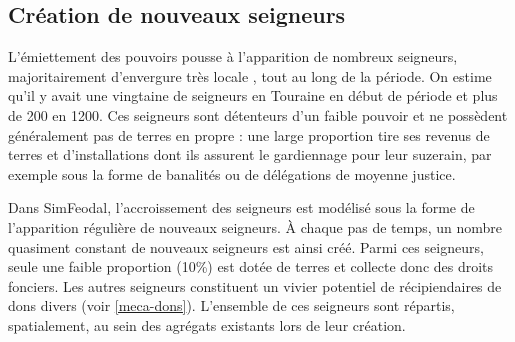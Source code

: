 %	
%



\subsection{Création de nouveaux seigneurs}

L'émiettement des pouvoirs pousse à l'apparition de nombreux seigneurs, majoritairement d'envergure très locale , tout au long de la période.
On estime qu'il y avait une vingtaine de seigneurs en Touraine en début de période et plus de 200 en 1200.
Ces seigneurs sont détenteurs d'un faible pouvoir et ne possèdent généralement pas de terres \og en propre\fg{} : une large proportion tire ses revenus de terres et d'installations dont ils assurent le gardiennage pour leur suzerain, par exemple sous la forme de banalités ou de délégations de moyenne justice.

\begin{tcolorbox}[breakable,left=0pt,right=0pt,top=0pt,bottom=0pt,
	colback=gray!15,colframe=gray!15,width=\dimexpr\textwidth\relax, 
	enlarge left by=0mm, boxsep=5pt,arc=0pt,outer arc=0pt]
Dans SimFeodal, l'accroissement des seigneurs est modélisé sous la forme de l'apparition régulière de nouveaux seigneurs.
À chaque pas de temps, un nombre quasiment constant\footnotemark{} de nouveaux seigneurs est ainsi créé.
Parmi ces seigneurs, seule une faible proportion (10\%) est dotée de terres et collecte donc des droits fonciers.
Les autres seigneurs constituent un vivier potentiel de récipiendaires de dons divers (voir \cref{meca-dons}).
L'ensemble de ces seigneurs sont répartis, spatialement, au sein des agrégats existants lors de leur création.
\end{tcolorbox}


